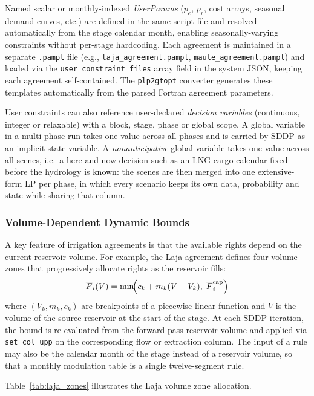 Named scalar or monthly-indexed \emph{UserParams} ($p_e$, $p_r$, cost
arrays, seasonal demand curves, etc.) are defined in the same script
file and resolved automatically from the stage calendar month, enabling
seasonally-varying constraints without per-stage hardcoding.
Each agreement is maintained in a separate \texttt{.pampl} file
(e.g., \texttt{laja\_agreement.pampl}, \texttt{maule\_agreement.pampl})
and loaded via the \texttt{user\_constraint\_files} array field in the
system JSON, keeping each agreement self-contained.
The \texttt{plp2gtopt} converter generates these templates automatically
from the parsed Fortran agreement parameters.

User constraints can also reference user-declared \emph{decision
variables} (continuous, integer or relaxable) with a block, stage, phase
or global scope.  A global variable in a multi-phase run takes one value
across all phases and is carried by SDDP as an implicit state variable.
A \emph{nonanticipative} global variable takes one value across all
scenes, i.e.\ a here-and-now decision such as an LNG cargo calendar
fixed before the hydrology is known: the scenes are then merged into
one extensive-form LP per phase, in which every scenario keeps its own
data, probability and state while sharing that column.

\subsubsection{Volume-Dependent Dynamic Bounds}

A key feature of irrigation agreements is that the available rights
depend on the current reservoir volume.  For example, the Laja agreement
defines four volume zones that progressively allocate rights as the
reservoir fills:
\begin{equation}
\label{eq:bound_rule}
\overline{F}_i(V) = \min\!\Bigl(
  c_k + m_k (V - V_k),\; \overline{F}_i^\text{cap}
\Bigr)
\end{equation}
where $(V_k, m_k, c_k)$ are breakpoints of a piecewise-linear function
and $V$ is the volume of the source reservoir at the start of the
stage.  At each SDDP
iteration, the bound is re-evaluated from the forward-pass reservoir
volume and applied via \texttt{set\_col\_upp} on the corresponding flow
or extraction column.  The input of a rule may also be the calendar
month of the stage instead of a reservoir volume, so that a monthly
modulation table is a single twelve-segment rule.

Table~\ref{tab:laja_zones} illustrates the Laja volume zone
allocation.

